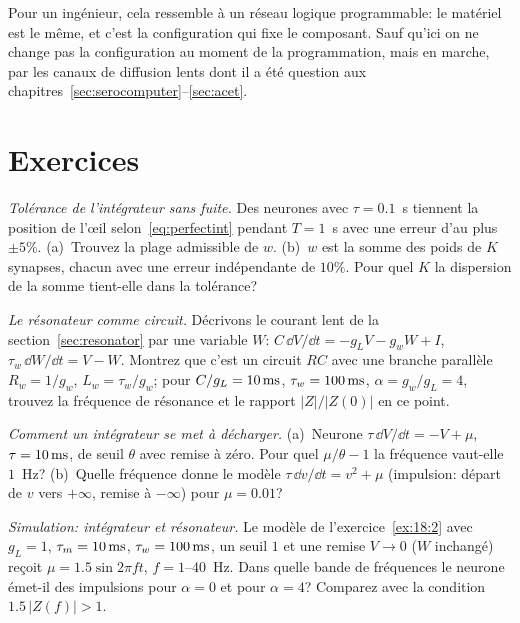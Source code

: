 Pour un ingénieur, cela ressemble à un réseau logique programmable: le matériel est le même, et c'est la configuration qui fixe le composant. Sauf qu'ici on ne change pas la configuration au moment de la programmation, mais en marche, par les canaux de diffusion lents dont il a été question aux chapitres~\ref{sec:serocomputer}--\ref{sec:acet}.

\section{Exercices}

\begin{exercise}[\lvlA]
\label{ex:18:1}
\emph{Tolérance de l'intégrateur sans fuite.} Des neurones avec $\tau=0.1$~s tiennent la position de l'œil selon~\eqref{eq:perfectint} pendant $T=1$~s avec une erreur d'au plus $\pm5\%$. (a)~Trouvez la plage admissible de $w$. (b)~$w$ est la somme des poids de $K$ synapses, chacun avec une erreur indépendante de $10\%$. Pour quel $K$ la dispersion de la somme tient-elle dans la tolérance?
\end{exercise}

\begin{exercise}[\lvlB]
\label{ex:18:2}
\emph{Le résonateur comme circuit.} Décrivons le courant lent de la section~\ref{sec:resonator} par une variable $W$: $C\,\dd V/\dd t=-g_LV-g_wW+I$, $\tau_w\,\dd W/\dd t=V-W$. Montrez que c'est un circuit $RC$ avec une branche parallèle $R_w=1/g_w$, $L_w=\tau_w/g_w$; pour $C/g_L=10\,\text{ms}$, $\tau_w=100\,\text{ms}$, $\alpha=g_w/g_L=4$, trouvez la fréquence de résonance et le rapport $|Z|/|Z(0)|$ en ce point.
\end{exercise}

\begin{exercise}[\lvlB]
\label{ex:18:3}
\emph{Comment un intégrateur se met à décharger.} (a)~Neurone $\tau\,\dd V/\dd t=-V+\mu$, $\tau=10\,\text{ms}$, de seuil $\theta$ avec remise à zéro. Pour quel $\mu/\theta-1$ la fréquence vaut-elle $1$~Hz? (b)~Quelle fréquence donne le modèle $\tau\,\dd v/\dd t=v^2+\mu$ (impulsion: départ de $v$ vers $+\infty$, remise à $-\infty$) pour $\mu=0.01$?
\end{exercise}

\begin{exercise}[\lvlB]
\label{ex:18:4}
\emph{Simulation: intégrateur et résonateur.} Le modèle de l'exercice~\ref{ex:18:2} avec $g_L=1$, $\tau_m=10\,\text{ms}$, $\tau_w=100\,\text{ms}$, un seuil $1$ et une remise $V\to0$ ($W$ inchangé) reçoit $\mu=1.5\sin2\pi ft$, $f=1$--$40$~Hz. Dans quelle bande de fréquences le neurone émet-il des impulsions pour $\alpha=0$ et pour $\alpha=4$? Comparez avec la condition $1.5\,|Z(f)|>1$.
\end{exercise}

